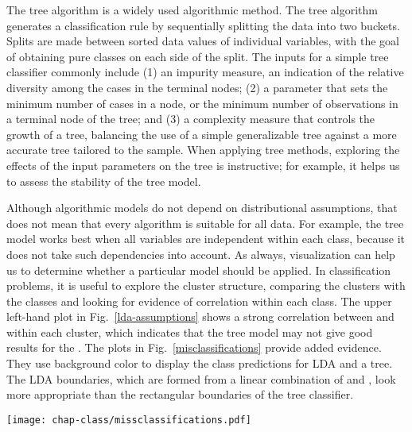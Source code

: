 

The tree algorithm \cite{BFOS84} is a widely used algorithmic method.
The tree algorithm generates a classification rule by sequentially
splitting the data into two buckets. Splits are made between sorted
data values of individual variables, with the goal of obtaining pure
classes on each side of the split. The inputs for a simple tree
classifier commonly include (1) an impurity measure, an indication of
the relative diversity among the cases in the terminal nodes; (2) a
parameter that sets the minimum number of cases in a node, or the
minimum number of observations in a terminal node of the tree; and (3)
a complexity measure that controls the growth of a tree, balancing the
use of a simple generalizable tree against a more accurate tree
tailored to the sample.  When applying tree methods, exploring the
effects of the input parameters on the tree is instructive; for
example, it helps us to assess the stability of the tree model.

Although algorithmic models do not depend on distributional assumptions,
that does not mean that every algorithm is suitable for all data.  For
example, the tree model works best when all variables are independent
within each class, because it does not take such dependencies into
account.  As always, visualization can help us to determine whether a
particular model should be applied.  In classification problems, it is
useful to explore the cluster structure, comparing the clusters with
the classes and looking for evidence of correlation within each class.
The upper left-hand plot in Fig.~\ref{lda-assumptions} shows a strong
correlation between  and  within each cluster,
which indicates that the tree model may not give good results for the
.  The plots in Fig.~\ref{misclassifications}
provide added evidence.  They use background color to display the
class predictions for LDA and a tree. The LDA boundaries, which are
formed from a linear combination of  and , look
more appropriate than the rectangular boundaries of the tree
classifier.

\begin{figure*}[htbp]
\centerline{{\texttt{[image: chap-class/missclassifications.pdf]}}}
\caption[Classification of the data space for the ]{Classification of the data space for the , as determined by LDA {\bf (left)} and a tree model {\bf
(right)}. Misclassified cases are highlighted.}
\label{misclassifications}
\end{figure*}

